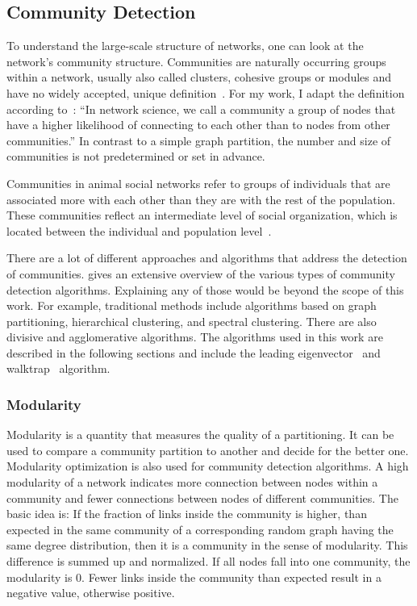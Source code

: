 \subsection{Community Detection}
\label{subsec:bg:communities}
To understand the large-scale structure of networks, one can look at the network's community structure. Communities are naturally occurring groups within a network, usually also called clusters, cohesive groups or modules and have no widely accepted, unique definition~\cite{palla2005uncovering}.
For my work, I adapt the definition according to~\textcite[p. 322]{barabasi2016network}: 
``In network science, we call a community a group of nodes that have a higher likelihood of connecting to each other than to nodes from other communities.'' In contrast to a simple graph partition, the number and size of communities is not predetermined or set in advance.

Communities in animal social networks refer to groups of individuals that are associated more with each other than they are with the rest of the population. These communities reflect an intermediate level of social organization, which is located between the individual and population level~\cite{croft2008exploring}.

There are a lot of different approaches and algorithms that address the detection of communities. \textcite{fortunato2010community} gives an extensive overview of the various types of community detection algorithms.
Explaining any of those would be beyond the scope of this work. For example, traditional methods include algorithms based on graph partitioning, hierarchical clustering, and spectral clustering. There are also divisive and agglomerative algorithms.
The algorithms used in this work are described in the following sections and include the leading eigenvector~\cite{newman2006finding} and walktrap~\cite{pons2005computing} algorithm.

\subsubsection{Modularity}
Modularity is a quantity that measures the quality of a partitioning.
It can be used to compare a community partition to another and decide for the better one.
Modularity optimization is also used for community detection algorithms.
A high modularity of a network indicates more connection between nodes within a community and fewer connections between nodes of different communities.
The basic idea is: If the fraction of links inside the community is higher, than expected in the same community of a corresponding random graph having the same degree distribution, then it is a community in the sense of modularity.
This difference is summed up and normalized.
If all nodes fall into one community, the modularity is $0$.
Fewer links inside the community than expected result in a negative value, otherwise positive.


